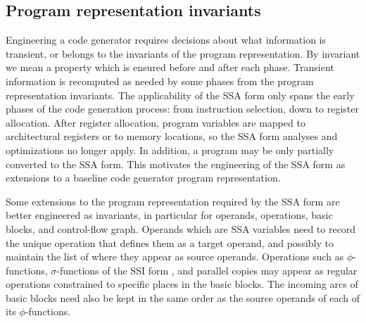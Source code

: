 %
%

\subsection{Program representation invariants}


Engineering a code generator requires decisions about what information is
transient, or belongs to the invariants of the program representation.  By
invariant we mean a property which is ensured before and after each phase.
Transient information is recomputed as needed by some phases from the program
representation invariants.  The applicability of the SSA form only spans the
early phases of the code generation process: from instruction selection, down to
register allocation.  After register allocation, program variables are mapped to
architectural registers or to memory locations, so the SSA form analyses and
optimizations no longer apply. In addition, a program may be only partially
converted to the SSA form. This motivates the engineering of the SSA form
as extensions to a baseline code generator program representation.

Some extensions to the program representation required by the SSA form are
better engineered as invariants, in particular for operands, operations, basic
blocks, and control-flow graph.  Operands which are SSA variables need to record
the unique operation that defines them as a target operand, and possibly to
maintain the list of where they appear as source operands. Operations such as
$\phi$-functions, $\sigma$-functions of the SSI form \cite{BoissinotBDR12}, and
parallel copies may appear as regular operations constrained to specific places
in the basic blocks. The incoming arcs of basic blocks need also be kept in the
same order as the source operands of each of its $\phi$-functions.

